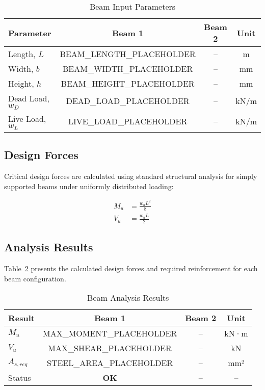 \documentclass[
  10pt,
  letterpaper,
  twocolumn
]{article}
\begin{document}
\begin{table}[h]
\centering
\caption{Beam Input Parameters}
\label{tab:beam_inputs}
\begin{tabular}{@{}lccc@{}}
\toprule
\textbf{Parameter} & \textbf{Beam 1} & \textbf{Beam 2} & \textbf{Unit} \\
\midrule
Length, $L$ & BEAM_LENGTH_PLACEHOLDER & -- & m \\
Width, $b$ & BEAM_WIDTH_PLACEHOLDER & -- & mm \\
Height, $h$ & BEAM_HEIGHT_PLACEHOLDER & -- & mm \\
Dead Load, $w_D$ & DEAD_LOAD_PLACEHOLDER & -- & kN/m \\
Live Load, $w_L$ & LIVE_LOAD_PLACEHOLDER & -- & kN/m \\
\bottomrule
\end{tabular}
\end{table}

\subsection{Design Forces}

Critical design forces are calculated using standard structural analysis for simply supported beams under uniformly distributed loading:

\begin{align}
M_u &= \frac{w_u L^2}{8} \label{eq:moment} \\
V_u &= \frac{w_u L}{2} \label{eq:shear}
\end{align}

\subsection{Analysis Results}

Table~\ref{tab:beam_results} presents the calculated design forces and required reinforcement for each beam configuration.

\begin{table}[h]
\centering
\caption{Beam Analysis Results}
\label{tab:beam_results}
\begin{tabular}{@{}lccc@{}}
\toprule
\textbf{Result} & \textbf{Beam 1} & \textbf{Beam 2} & \textbf{Unit} \\
\midrule
$M_u$ & MAX_MOMENT_PLACEHOLDER & -- & kN·m \\
$V_u$ & MAX_SHEAR_PLACEHOLDER & -- & kN \\
$A_{s,req}$ & STEEL_AREA_PLACEHOLDER & -- & mm² \\
Status & \textcolor{ghaligreen}{\textbf{OK}} & -- & -- \\
\bottomrule
\end{tabular}
\end{table}
\end{document}
